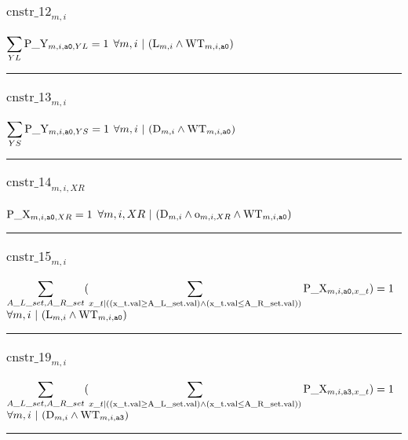 \documentclass[11pt]{article}
\begin{document}
\subsubsection*{$\text{cnstr\_12}_{m, i}$} \label{cnstr_12}
$
\displaystyle \sum_{YL}\textcolor{black}{\text{P\_Y}}_{m, i, \texttt{a0}, YL} = 1
$
\hfill
$
\forall{ m, i}  ~ | ~ ( \textcolor{black}{\text{L}}_{m, i} \wedge \textcolor{black}{\text{WT}}_{m, i, \texttt{a0}} )
$ \vspace{5pt}
\hrule 
\subsubsection*{$\text{cnstr\_13}_{m, i}$} \label{cnstr_13}
$
\displaystyle \sum_{YS}\textcolor{black}{\text{P\_Y}}_{m, i, \texttt{a0}, YS} = 1
$
\hfill
$
\forall{ m, i}  ~ | ~ ( \textcolor{black}{\text{D}}_{m, i} \wedge \textcolor{black}{\text{WT}}_{m, i, \texttt{a0}} )
$ \vspace{5pt}
\hrule 
\subsubsection*{$\text{cnstr\_14}_{m, i, XR}$} \label{cnstr_14}
$
\textcolor{black}{\text{P\_X}}_{m, i, \texttt{a0}, XR} = 1
$
\hfill
$
\forall{ m, i, XR}  ~ | ~ ( \textcolor{black}{\text{D}}_{m, i} \wedge \textcolor{black}{\text{o}}_{m, i, XR} \wedge \textcolor{black}{\text{WT}}_{m, i, \texttt{a0}} )
$ \vspace{5pt}
\hrule 
\subsubsection*{$\text{cnstr\_15}_{m, i}$} \label{cnstr_15}
$
\displaystyle \sum_{A\_L\_set, A\_R\_set} ( \displaystyle \sum_{x\_t |  (  ( \textcolor{black}{\text{x\_t.val}}  \geq  \textcolor{black}{\text{A\_L\_set.val}} )  \wedge  ( \textcolor{black}{\text{x\_t.val}}  \leq  \textcolor{black}{\text{A\_R\_set.val}} )  )}\textcolor{black}{\text{P\_X}}_{m, i, \texttt{a0}, x\_t} )  = 1
$
\hfill
$
\forall{ m, i}  ~ | ~ ( \textcolor{black}{\text{L}}_{m, i} \wedge \textcolor{black}{\text{WT}}_{m, i, \texttt{a0}} )
$ \vspace{5pt}
\hrule 
\subsubsection*{$\text{cnstr\_19}_{m, i}$} \label{cnstr_19}
$
\displaystyle \sum_{A\_L\_set, A\_R\_set} ( \displaystyle \sum_{x\_t |  (  ( \textcolor{black}{\text{x\_t.val}}  \geq  \textcolor{black}{\text{A\_L\_set.val}} )  \wedge  ( \textcolor{black}{\text{x\_t.val}}  \leq  \textcolor{black}{\text{A\_R\_set.val}} )  )}\textcolor{black}{\text{P\_X}}_{m, i, \texttt{a3}, x\_t} )  = 1
$
\hfill
$
\forall{ m, i}  ~ | ~ ( \textcolor{black}{\text{D}}_{m, i} \wedge \textcolor{black}{\text{WT}}_{m, i, \texttt{a3}} )
$ \vspace{5pt}
\hrule 
\end{document}
